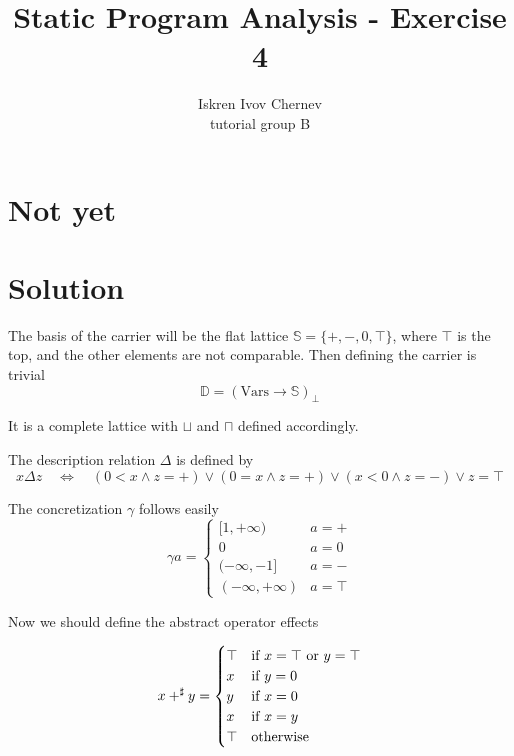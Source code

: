\documentclass[a4paper]{article}
\begin{document}
\newcommand{\aee}[1] {[[#1]]^\sharp}
\newcommand{\cc}[1] {\texttt{#1}}
\def\A {\mathcal{A}}
\def\N {\mathcal{N}}
\def\NonZero {\mathrm{NonZero}}
\def\Zero {\mathrm{Zero}}
\def\Vars {\mathrm{Vars}}
\def\Occ {\mathrm{Occ}}

\title{Static Program Analysis - Exercise 4}
\author{Iskren Ivov Chernev \\ tutorial group B}

\maketitle

\section{Not yet}
\section{Solution}

The basis of the carrier will be the flat lattice $ \mathbb{S} = \{ +, -, 0,
\top \} $, where $ \top $ is the top, and the other elements are not
comparable. Then defining the carrier is trivial $$ \mathbb{D} = (\Vars \to
\mathbb{S})_{\bot} $$

It is a complete lattice with $ \sqcup $ and $ \sqcap $ defined accordingly.

The description relation $ \Delta $ is defined by $$ x \Delta z \quad \iff
\quad (0 < x \land z = +) \lor (0 = x \land z = +) \lor (x < 0 \land z = -)
\lor z = \top $$

The concretization $ \gamma $ follows easily
$$
\gamma a = \begin{cases}
  [1, +\infty)        & a = + \\
  0                   & a = 0 \\
  (-\infty, -1]       & a = - \\
  (-\infty, +\infty)  & a = \top
\end{cases}
$$

Now we should define the abstract operator effects

$$
  x +^\sharp y = \begin{cases}
    \top      & \text{if $ x = \top $ or $ y = \top $}\\
    x         & \text{if $ y = 0 $} \\
    y         & \text{if $ x = 0 $} \\
    x         & \text{if $ x = y $} \\
    \top      & \text{otherwise}
  \end{cases}
$$
\end{document}
